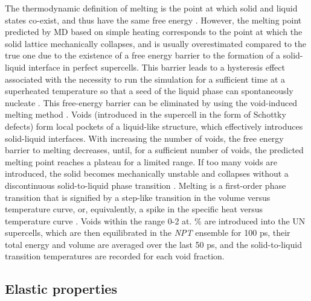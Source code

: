 \documentclass[preprint, 12pt]{elsarticle}
\begin{document}
The thermodynamic definition of melting is the point at which solid and liquid states co-exist, and thus have the same free energy \cite{Alavi2006, Zhang2012}. However, the melting point predicted by MD based on simple heating corresponds to the point at which the solid lattice mechanically collapses, and is usually overestimated compared to the true one due to the existence of a free energy barrier to the formation of a solid-liquid interface in perfect supercells. This barrier leads to a hysteresis effect associated with the necessity to run the simulation for a sufficient time at a superheated temperature so that a seed of the liquid phase can spontaneously nucleate \cite{Ercolessi1997, Alavi2006}. This free-energy barrier can be eliminated by using the void-induced melting method \cite{Alavi2006, Zhang2012}. Voids (introduced in the supercell in the form of Schottky defects) form local pockets of a liquid-like structure, which effectively introduces solid-liquid interfaces. With increasing the number of voids, the free energy barrier to melting decreases, until, for a sufficient number of voids, the predicted melting point reaches a plateau for a limited range. If too many voids are introduced, the solid becomes mechanically unstable and collapses without a discontinuous solid-to-liquid phase transition \cite{Alavi2006}. Melting is a first-order phase transition that is signified by a step-like transition in the volume versus temperature curve, or, equivalently, a spike in the specific heat versus temperature curve \cite{Blundell2010}. Voids within the range 0-2 at. \% are introduced into the UN supercells, which are then equilibrated in the \textit{NPT} ensemble for 100 ps, their total energy and volume are averaged over the last 50 ps, and the solid-to-liquid transition temperatures are recorded for each void fraction. 

\subsection{Elastic properties}
\end{document}
